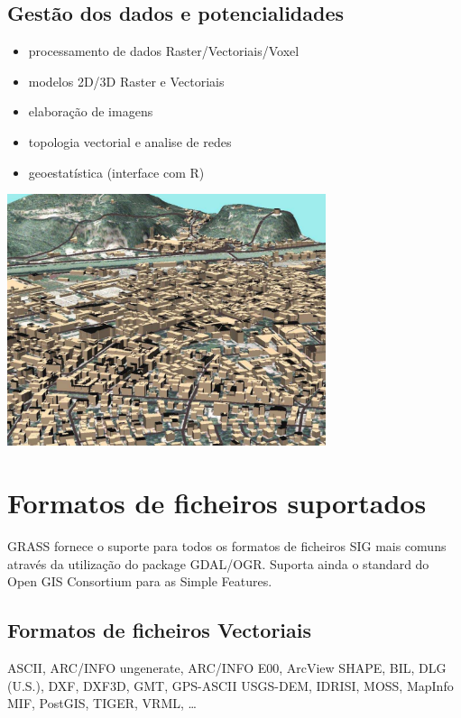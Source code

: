\documentclass[notumble,a4paper,10pt,nofoldmark]{leaflet}
\newenvironment{myfig}[1][0pt plus 1.5ex minus .5ex]{\par\vspace*{#1}\begin{minipage}{\textwidth}\centering}{\end{minipage}}
\begin{document}
\subsection{Gest\~{a}o dos dados e potencialidades}

\begin{itemize}
\item processamento de dados Raster/Vectoriais/Voxel
\item modelos 2D/3D Raster e Vectoriais
\item elabora\c{c}\~{a}o de imagens
\item topologia vectorial e analise de redes
\item geoestat\'{i}stica (interface com R)
\end{itemize}

\begin{myfig}[1ex]
\includegraphics[width=0.7\textwidth]{trento3d}
\end{myfig}

\section{Formatos de ficheiros suportados}

GRASS fornece o suporte para todos os formatos de ficheiros SIG mais comuns atrav\'{e}s da utiliza\c{c}\~{a}o do package GDAL/OGR. Suporta ainda o standard do Open GIS Consortium para as Simple Features.

\subsection{Formatos de ficheiros Vectoriais}
ASCII, ARC/INFO ungenerate, ARC/INFO E00, Arc\-View SHAPE, BIL, DLG (U.S.), DXF, DXF3D, GMT, GPS-ASCII USGS-DEM, IDRISI, MOSS, MapInfo MIF, PostGIS, TIGER, VRML, \dots
\end{document}
